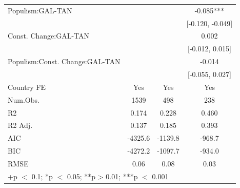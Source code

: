 \documentclass[
  abstract]{article}
\begin{document}
\begin{table}
\begin{tabular}[t]{lccc}
Populism:GAL-TAN &  &  & -0.085***\\
 &  &  & {}[-0.120, -0.049]\\
Const. Change:GAL-TAN &  &  & 0.002\\
 &  &  & {}[-0.012, 0.015]\\
Populism:Const. Change:GAL-TAN &  &  & -0.014\\
 &  &  & {}[-0.055, 0.027]\\
\midrule
Country FE & Yes & Yes & Yes\\
Num.Obs. & 1539 & 498 & 238\\
R2 & 0.174 & 0.228 & 0.460\\
R2 Adj. & 0.137 & 0.185 & 0.393\\
AIC & -4325.6 & -1139.8 & -968.7\\
BIC & -4272.2 & -1097.7 & -934.0\\
RMSE & 0.06 & 0.08 & 0.03\\
\bottomrule
\multicolumn{4}{l}{\rule{0pt}{1em}+p $<$ 0.1; *p $<$ 0.05; **p > 0.01; ***p $<$ 0.001}\\
\end{tabular}
\end{table}
\end{document}
